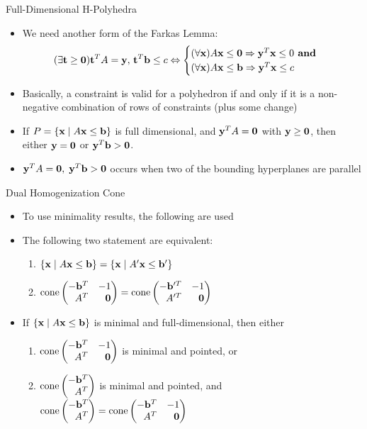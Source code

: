 \documentclass{beamer}
\begin{document}
\begin{frame}{Full-Dimensional H-Polyhedra}
\begin{itemize}
  \item We need another form of the Farkas Lemma:
      \[ (\exists \mathbf{t}\geq\mathbf{0}) \mathbf{t}^T A = \mathbf{y},\, \mathbf{t}^T\mathbf{b} \leq c \Leftrightarrow
        \begin{cases}
        (\forall \mathbf{x}) A\mathbf{x}\leq \mathbf{0} \Rightarrow \mathbf{y}^T\mathbf{x} \leq 0 \textbf{ and } \\
        (\forall \mathbf{x}) A\mathbf{x}\leq \mathbf{b} \Rightarrow \mathbf{y}^T\mathbf{x} \leq c
        \end{cases}
      \]
  \item Basically, a constraint is valid for a polyhedron if and only if it is a non-negative combination of rows of constraints (plus some change)
  \item If $P = \left\{\mathbf{x}\;|\; A\mathbf{x}\leq \mathbf{b}\right\}$ is full dimensional, and $\mathbf{y}^T A = \mathbf{0}$ with $\mathbf{y}\geq\mathbf{0}$, then either $\mathbf{y} = \mathbf{0}$ or $\mathbf{y}^T \mathbf{b} > \mathbf{0}$.
  \item $\mathbf{y}^T A = \mathbf{0},\;\mathbf{y}^T \mathbf{b} > \mathbf{0}$ occurs when two of the bounding hyperplanes are parallel
\end{itemize}
\end{frame}

\begin{frame}{Dual Homogenization Cone}
\begin{itemize}
  \item To use minimality results, the following are used
  \item 	The following two statement are equivalent:
    \begin{enumerate}
      \item $\left\{\mathbf{x}\;|\; A\mathbf{x}\leq \mathbf{b}\right\} = \left\{\mathbf{x}\;|\; A'\mathbf{x}\leq \mathbf{b}'\right\}$
      \item $\cone \pmb -\vec{b}^T & -1 \\ A^T & \0 \pme = \cone \pmb -\vec{b}'^T & -1 \\ A'^T & \0 \pme$
    \end{enumerate}
  \item If $\left\{\mathbf{x}\;|\; A\mathbf{x}\leq \mathbf{b}\right\}$ is minimal and full-dimensional, then either 
    \begin{enumerate}
      \item $\cone \pmb -\vec{b}^T & -1 \\ A^T & \0 \pme$ is minimal and pointed, or
      \item $\cone \pmb -\vec{b}^T \\ A^T \pme$ is minimal and pointed, and $\cone\pmb -\vec{b}^T \\ A^T \pme = \cone \pmb -\vec{b}^T & -1 \\ A^T & \0 \pme$
    \end{enumerate}
\end{itemize}
\end{frame}
\end{document}
